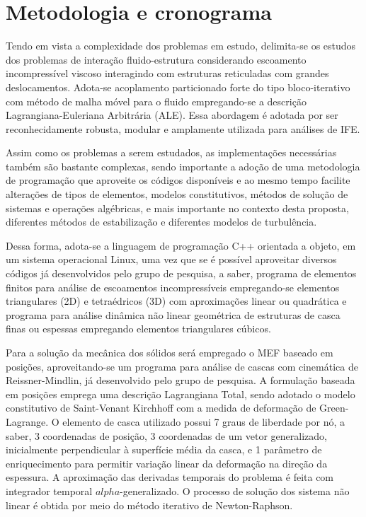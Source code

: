 \chapter{Metodologia e cronograma} \label{MetodologiaCronograma}

Tendo em vista a complexidade dos problemas em estudo, delimita-se os estudos dos problemas de interação fluido-estrutura considerando escoamento incompressível viscoso interagindo com estruturas reticuladas com grandes deslocamentos. Adota-se acoplamento particionado forte do tipo bloco-iterativo com método de malha móvel para o fluido empregando-se a descrição Lagrangiana-Euleriana Arbitrária (ALE). Essa abordagem é adotada por ser reconhecidamente robusta, modular e amplamente utilizada para análises de IFE.

Assim como os problemas a serem estudados, as implementações necessárias também são bastante complexas, sendo importante a adoção de uma metodologia de programação que aproveite os códigos disponíveis e ao mesmo tempo facilite alterações de tipos de elementos, modelos constitutivos, métodos de solução de sistemas e operações algébricas, e mais importante no contexto desta proposta, diferentes métodos de estabilização e diferentes modelos de turbulência.

Dessa forma, adota-se a linguagem de programação C++ orientada a objeto, em um sistema operacional Linux, uma vez que se é possível aproveitar diversos códigos já desenvolvidos pelo grupo de pesquisa, a saber, programa de elementos finitos para análise de escoamentos incompressíveis empregando-se elementos triangulares (2D) e tetraédricos (3D) com aproximações linear ou quadrática e programa para análise dinâmica não linear geométrica de estruturas de casca finas ou espessas empregando elementos triangulares cúbicos.

Para a solução da mecânica dos sólidos será empregado o MEF baseado em posições, aproveitando-se um programa para análise de cascas com cinemática de Reissner-Mindlin, já desenvolvido pelo grupo de pesquisa. A formulação baseada em posições emprega uma descrição Lagrangiana Total, sendo adotado o modelo constitutivo de Saint-Venant Kirchhoff  com a medida de deformação de Green-Lagrange. O elemento de casca utilizado possui 7 graus de liberdade por nó, a saber, 3 coordenadas de posição, 3 coordenadas de um vetor generalizado, inicialmente perpendicular à superfície média da casca, e 1 parâmetro de enriquecimento para permitir variação linear da deformação na direção da espessura. A aproximação das derivadas temporais do problema é feita com integrador temporal $alpha$-generalizado. O processo de solução dos sistema não linear é obtida por meio do método iterativo de Newton-Raphson. 


